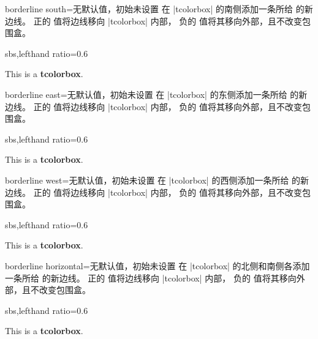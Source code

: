 \begin{docTcbKey}[][doc new=2014-10-20]{borderline south}{=}{无默认值，初始未设置}
  在 |tcolorbox| 的南侧添加一条所给  的新边线。
  正的  值将边线移向 |tcolorbox| 内部，
  负的  值将其移向外部，且不改变包围盒。
\begin{dispExample*}{sbs,lefthand ratio=0.6}
\begin{tcolorbox}[enhanced,
  borderline south={2pt}{-2pt}{red}]
  This is a \textbf{tcolorbox}.
\end{tcolorbox}
\end{dispExample*}
\end{docTcbKey}

\begin{docTcbKey}[][doc new=2014-10-20]{borderline east}{=}{无默认值，初始未设置}
  在 |tcolorbox| 的东侧添加一条所给  的新边线。
  正的  值将边线移向 |tcolorbox| 内部，
  负的  值将其移向外部，且不改变包围盒。
\begin{dispExample*}{sbs,lefthand ratio=0.6}
\begin{tcolorbox}[enhanced,
  borderline east={2pt}{-2pt}{red}]
  This is a \textbf{tcolorbox}.
\end{tcolorbox}
\end{dispExample*}
\end{docTcbKey}

\begin{docTcbKey}[][doc new=2014-10-20]{borderline west}{=}{无默认值，初始未设置}
  在 |tcolorbox| 的西侧添加一条所给  的新边线。
  正的  值将边线移向 |tcolorbox| 内部，
  负的  值将其移向外部，且不改变包围盒。
\begin{dispExample*}{sbs,lefthand ratio=0.6}
\begin{tcolorbox}[enhanced,
  borderline west={2pt}{-2pt}{red}]
  This is a \textbf{tcolorbox}.
\end{tcolorbox}
\end{dispExample*}
\end{docTcbKey}

\clearpage
\begin{docTcbKey}[][doc new=2014-10-20]{borderline horizontal}{=}{无默认值，初始未设置}
  在 |tcolorbox| 的北侧和南侧各添加一条所给  的新边线。
  正的  值将边线移向 |tcolorbox| 内部，
  负的  值将其移向外部，且不改变包围盒。
\begin{dispExample*}{sbs,lefthand ratio=0.6}
\begin{tcolorbox}[blanker,top=3mm,bottom=3mm,
   borderline horizontal={2pt}{0pt}{red}]
  This is a \textbf{tcolorbox}.
\end{tcolorbox}
\end{dispExample*}
\end{docTcbKey}


